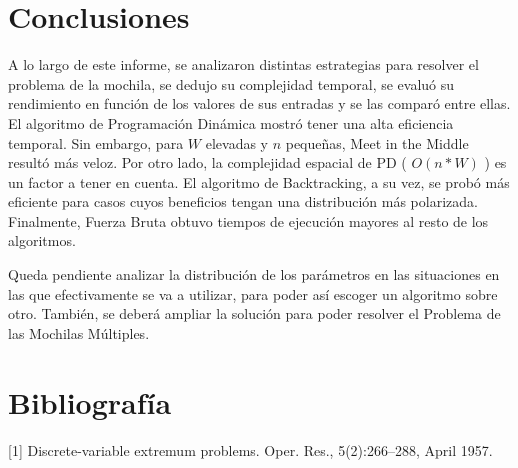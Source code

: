 \documentclass[a4paper]{article}
\begin{document}
\section{Conclusiones}

A lo largo de este informe, se analizaron distintas estrategias para resolver el problema de la mochila, se dedujo su complejidad temporal, se evaluó su rendimiento en función de los valores de sus entradas y se las comparó entre ellas. El algoritmo de Programación Dinámica mostró tener una alta eficiencia temporal. Sin embargo, para $W$ elevadas y $n$ pequeñas, Meet in the Middle resultó más veloz. Por otro lado, la complejidad espacial de PD ( $O(n*W)$ ) es un factor a tener en cuenta. El algoritmo de Backtracking, a su vez, se probó más eficiente para casos cuyos beneficios tengan una distribución más polarizada. Finalmente, Fuerza Bruta obtuvo tiempos de ejecución mayores al resto de los algoritmos. 

Queda pendiente analizar la distribución de los parámetros en las situaciones en las que efectivamente se va a utilizar, para poder así escoger un algoritmo sobre otro. También, se deberá ampliar la solución para poder resolver el Problema de las Mochilas Múltiples. 



\section{Bibliografía}
 [1] Discrete-variable extremum problems. Oper. Res., 5(2):266–288, April 1957.
\end{document}
